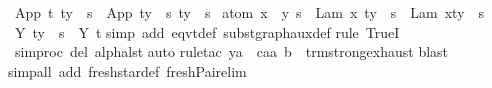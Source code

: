 \begin{isabellebody}
{\isacharbar}\ {\isachardoublequoteopen}{\isacharparenleft}App\ t{}\ t{}{\isacharparenright}{\isacharbrackleft}y\ {\isacharcolon}{\isacharcolon}{\isacharequal}\ s{\isacharbrackright}\ {\isacharequal}\ App\ {\isacharparenleft}t{}{\isacharbrackleft}y\ {\isacharcolon}{\isacharcolon}{\isacharequal}\ s{\isacharbrackright}{\isacharparenright}\ {\isacharparenleft}t{}{\isacharbrackleft}y\ {\isacharcolon}{\isacharcolon}{\isacharequal}\ s{\isacharbrackright}{\isacharparenright}{\isachardoublequoteclose}\isanewline
{\isacharbar}\ {\isachardoublequoteopen}atom\ x\ {\isasymsharp}\ {\isacharparenleft}y{\isacharcomma}\ s{\isacharparenright}\ {\isasymLongrightarrow}\ {\isacharparenleft}Lam\ {\isacharbrackleft}x{\isacharbrackright}{\isachardot}\ t{\isacharparenright}{\isacharbrackleft}y\ {\isacharcolon}{\isacharcolon}{\isacharequal}\ s{\isacharbrackright}\ {\isacharequal}\ Lam\ {\isacharbrackleft}x{\isacharbrackright}{\isachardot}{\isacharparenleft}t{\isacharbrackleft}y\ {\isacharcolon}{\isacharcolon}{\isacharequal}\ s{\isacharbrackright}{\isacharparenright}{\isachardoublequoteclose}\isanewline
{\isacharbar}\ {\isachardoublequoteopen}{\isacharparenleft}Y\ t{\isacharparenright}{\isacharbrackleft}y\ {\isacharcolon}{\isacharcolon}{\isacharequal}\ s{\isacharbrackright}\ {\isacharequal}\ Y\ t{\isachardoublequoteclose}\isanewline
%
\isadelimproof
%
\endisadelimproof
%
\isatagproof
{}\isamarkupfalse%
{\isacharparenleft}simp\ add{\isacharcolon}\ eqvt{\isacharunderscore}def\ subst{\isacharunderscore}graph{\isacharunderscore}aux{\isacharunderscore}def{\isacharparenright}\isanewline
{}\isamarkupfalse%
{\isacharparenleft}rule\ TrueI{\isacharparenright}\isanewline
{}\isamarkupfalse%
\ {\isacharbrackleft}{\isacharbrackleft}simproc\ del{\isacharcolon}\ alpha{\isacharunderscore}lst{\isacharbrackright}{\isacharbrackright}\isanewline
{}\isamarkupfalse%
{\isacharparenleft}auto{\isacharparenright}\isanewline
{}\isamarkupfalse%
{\isacharparenleft}rule{\isacharunderscore}tac\ y{\isacharequal}{\isachardoublequoteopen}a{\isachardoublequoteclose}\ \ c{\isacharequal}{\isachardoublequoteopen}{\isacharparenleft}aa{\isacharcomma}\ b{\isacharparenright}{\isachardoublequoteclose}\ \ trm{\isachardot}strong{\isacharunderscore}exhaust{\isacharparenright}\isanewline
{}\isamarkupfalse%
{\isacharparenleft}blast{\isacharparenright}{\isacharplus}\isanewline
{}\isamarkupfalse%
{\isacharparenleft}simp{\isacharunderscore}all\ add{\isacharcolon}\ fresh{\isacharunderscore}star{\isacharunderscore}def\ fresh{\isacharunderscore}Pair{\isacharunderscore}elim{\isacharparenright}\isanewline

\end{isabellebody}
